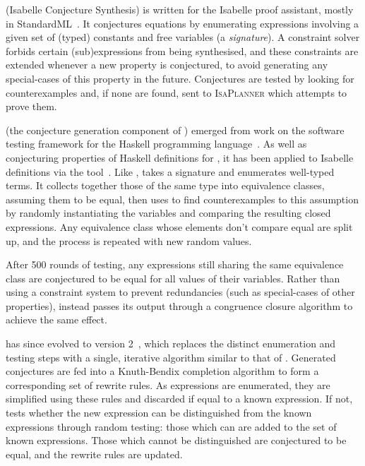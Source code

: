 \isacosy{} (Isabelle Conjecture Synthesis) is written for the Isabelle
proof assistant, mostly in
StandardML~\cite{Johansson.Dixon.Bundy:conjecture-generation}. It conjectures
equations by enumerating expressions involving a given set of (typed) constants
and free variables (a \emph{signature}). A constraint solver forbids certain
(sub)expressions from being synthesised, and these constraints are extended
whenever a new property is conjectured, to avoid generating any special-cases of
this property in the future. Conjectures are tested by looking for
counterexamples and, if none are found, sent to \textsc{IsaPlanner} which
attempts to prove them.

\quickspec{} (the conjecture generation component of \hipspec{})
emerged from work on the \quickcheck{} software testing framework for the
Haskell programming language~\cite{claessen2011quickcheck}. As well as
conjecturing properties of Haskell definitions for \hipspec{}, it has been
applied to Isabelle definitions via the \hipster{} tool~\cite{Hipster}.
Like \isacosy{}, \quickspec{} takes a signature and enumerates
well-typed terms. It collects together those of the same type into equivalence
classes, assuming them to be equal, then uses \quickcheck{} to find
counterexamples to this assumption by randomly instantiating the variables and
comparing the resulting closed expressions. Any equivalence class whose elements
don't compare equal are split up, and the process is repeated with new random
values.

After 500 rounds of testing, any expressions still sharing the same equivalence
class are conjectured to be equal for all values of their variables. Rather than
using a constraint system to prevent redundancies (such as special-cases of
other properties), \quickspec{} instead passes its output through a
congruence closure algorithm to achieve the same effect.

\quickspec{} has since evolved to version 2~\cite{smallbone2017quick},
which replaces the distinct enumeration and testing steps with a single,
iterative algorithm similar to that of \isacosy{}. Generated conjectures
are fed into a Knuth-Bendix completion algorithm to form a corresponding set of
rewrite rules. As expressions are enumerated, they are simplified using these
rules and discarded if equal to a known expression. If not, \quickcheck{}
tests whether the new expression can be distinguished from the known expressions
through random testing: those which can are added to the set of known
expressions. Those which cannot be distinguished are conjectured to be equal,
and the rewrite rules are updated.

